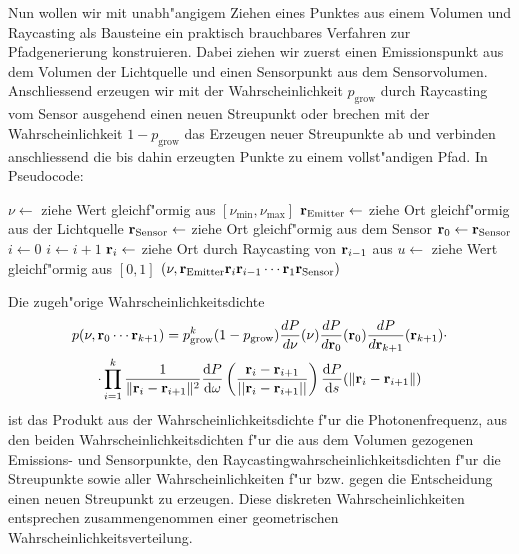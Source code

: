 	Nun wollen wir mit unabh"angigem Ziehen eines Punktes aus einem Volumen und Raycasting als Bausteine ein praktisch brauchbares Verfahren zur Pfadgenerierung konstruieren. Dabei ziehen wir zuerst einen Emissionspunkt aus dem Volumen der Lichtquelle und einen Sensorpunkt aus dem Sensorvolumen. Anschliessend erzeugen wir mit der Wahrscheinlichkeit $p_\text{grow}$ durch Raycasting vom Sensor ausgehend einen neuen Streupunkt oder brechen mit der Wahrscheinlichkeit $1-p_\text{grow}$ das Erzeugen neuer Streupunkte ab und verbinden anschliessend die bis dahin erzeugten Punkte zu einem vollst"andigen Pfad. In Pseudocode:
	
	\begin{algorithmic}
		\STATE $\nu \leftarrow$ ziehe Wert gleichf"ormig aus $[\nu_\text{min},\nu_\text{max}]$
		\STATE $\mathbf{r}_\text{Emitter} \leftarrow$ ziehe Ort gleichf"ormig aus der Lichtquelle
		\STATE $\mathbf{r}_\text{Sensor} \leftarrow$ ziehe Ort gleichf"ormig aus dem Sensor
		\STATE $\mathbf{r}_0 \leftarrow \mathbf{r}_\text{Sensor}$
		\STATE $i \leftarrow 0$
		\REPEAT
			\STATE $i \leftarrow i+1$
			\STATE $\mathbf{r}_i \leftarrow$ ziehe Ort durch Raycasting von $\mathbf{r}_{i-1}$ aus
			\STATE $u \leftarrow$ ziehe Wert gleichf"ormig aus $[0,1]$
	  \RETURN $(\nu,\mathbf{r}_\text{Emitter}\mathbf{r}_i\mathbf{r}_{i-1}\cdots\mathbf{r}_1\mathbf{r}_\text{Sensor})$
	\end{algorithmic}
	
	Die zugeh"orige Wahrscheinlichkeitsdichte
	\begin{multline*}
		p(\nu,\mathbf{r}_0\cdots\mathbf{r}_{k+1})=p_\text{grow}^k(1-p_\text{grow})\frac{dP}{d\nu}(\nu)\frac{dP}{d\mathbf{r}_0}(\mathbf{r}_0)\frac{dP}{d\mathbf{r}_{k+1}}(\mathbf{r}_{k+1}) \cdot \\
	\cdot \prod_{i=1}^k \frac{1}{\|\mathbf{r}_i - \mathbf{r}_{i+1}\|^2} \frac{\text{d}P}{\text{d}\omega}\left(\frac{\mathbf{r}_i - \mathbf{r}_{i+1}}{||\mathbf{r}_i - \mathbf{r}_{i+1}||}\right) \frac{\text{d}P}{\text{d}s}(\|\mathbf{r}_i-\mathbf{r}_{i+1}\|)
	\end{multline*}
	ist das Produkt aus der Wahrscheinlichkeitsdichte f"ur die Photonenfrequenz, aus den beiden Wahrscheinlichkeitsdichten f"ur die aus dem Volumen gezogenen Emissions- und Sensorpunkte, den Ray\-casting\-wahr\-schein\-lich\-keits\-dich\-ten f"ur die Streupunkte sowie aller Wahrscheinlichkeiten f"ur bzw. gegen die Entscheidung einen neuen Streupunkt zu erzeugen. Diese diskreten Wahrscheinlichkeiten entsprechen zusammengenommen einer geometrischen Wahrscheinlichkeitsverteilung.
	
